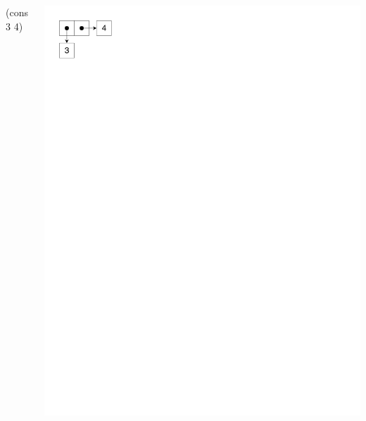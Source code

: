 \documentclass[UKenglish,usenames,dvipsnames,svgnames,table,aspectratio=169,mathserif]{beamer}
\begin{document}
\begin{frame}[fragile]
\begin{columns}[T]
\LARGE
{}
\begin{schemecode}
  (cons 3 4)
\end{schemecode}
\includegraphics{list-cons1.pdf}


\end{columns}
\end{frame}
\end{document}
